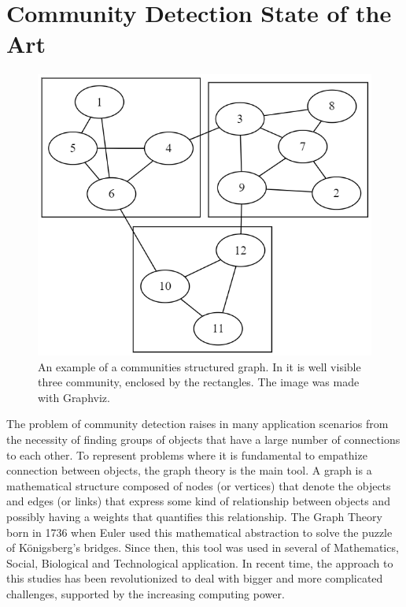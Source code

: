 \section{Community Detection State of the Art}
\begin{figure}[h]
	\centering
	\includegraphics[width=0.6\linewidth]{0-resources/community1}
	\caption{An example of a communities structured graph. In it is well visible three community, enclosed by the rectangles. The image was made with Graphviz.}
	\label{fig:community1}
\end{figure}
The problem of community detection raises in many application scenarios from the necessity of finding groups of objects that have a large number of connections to each other. To represent problems where it is fundamental to empathize connection between objects, the graph theory is the main tool. A graph is a mathematical structure composed of nodes (or vertices) that denote the objects and edges (or links) that express some kind of relationship between objects and possibly having a weights that quantifies this relationship.
The Graph Theory born in 1736 when Euler used this mathematical abstraction to solve the puzzle of Königsberg’s bridges. Since then, this tool was used in several of Mathematics, Social, Biological and Technological application. In recent time, the approach to this studies has been revolutionized to deal with bigger and more complicated challenges, supported by the increasing computing power.
